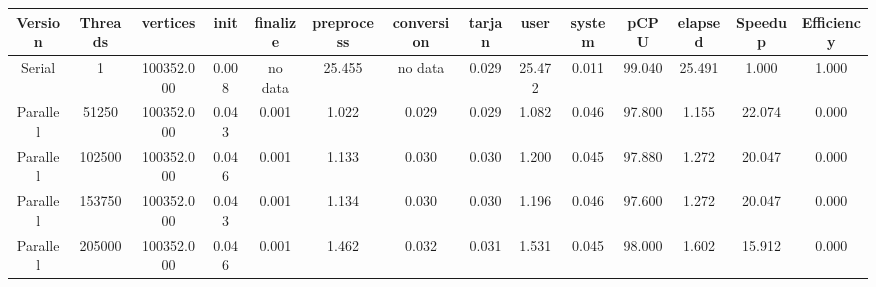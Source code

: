 \begin{tabular}{|c|c|c|c|c|c|c|c|c|c|c|c|c|c|}
\toprule
 Version &  Threads &   vertices &  init & finalize &  preprocess & conversion &  tarjan &   user &  system &   pCPU &  elapsed &  Speedup &  Efficiency \\
\midrule
  Serial &        1 & 100352.000 & 0.008 &  no data &      25.455 &    no data &   0.029 & 25.472 &   0.011 & 99.040 &   25.491 &    1.000 &       1.000 \\
Parallel &    51250 & 100352.000 & 0.043 &    0.001 &       1.022 &      0.029 &   0.029 &  1.082 &   0.046 & 97.800 &    1.155 &   22.074 &       0.000 \\
Parallel &   102500 & 100352.000 & 0.046 &    0.001 &       1.133 &      0.030 &   0.030 &  1.200 &   0.045 & 97.880 &    1.272 &   20.047 &       0.000 \\
Parallel &   153750 & 100352.000 & 0.043 &    0.001 &       1.134 &      0.030 &   0.030 &  1.196 &   0.046 & 97.600 &    1.272 &   20.047 &       0.000 \\
Parallel &   205000 & 100352.000 & 0.046 &    0.001 &       1.462 &      0.032 &   0.031 &  1.531 &   0.045 & 98.000 &    1.602 &   15.912 &       0.000 \\
\bottomrule
\end{tabular}
